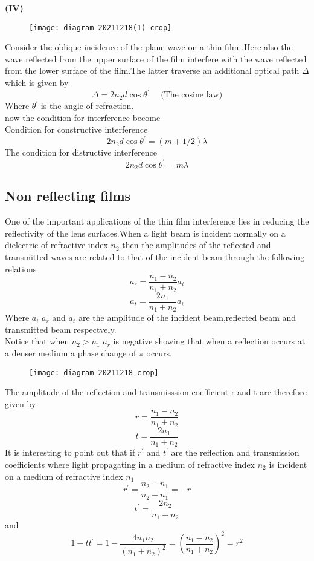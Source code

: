 \textbf{(IV)}
\begin{figure}[H]
	\centering
	\texttt{[image: diagram-20211218(1)-crop]}
	\caption{}
	\label{}
\end{figure}
Consider the oblique incidence of the plane wave on a thin film .Here also the wave reflected from the upper surface of the film interfere with the wave reflected from the lower surface of the film.The latter traverse an additional optical path $\Delta$ which is given by \\
$$\Delta=2n_2d\cos \theta^{\prime} \quad \text{ (The cosine law)}$$
Where $\theta^{\prime}$  is the angle of refraction.\\
now the  condition for interference become\\
Condition for constructive interference 
$$2n_2d\cos \theta^{\prime}=\left( m+1/2\right)\lambda $$
The condition for distructive interference\\
$$2n_2d\cos \theta^{\prime}=m\lambda$$
\subsection{Non reflecting films}
One of the important applications of the thin film interference lies in reducing the reflectivity of the lens surfaces.When a light beam is incident normally on a dielectric of refractive index $n_2$ then the amplitudes of the reflected and transmitted waves are related to that of the incident beam through the following relations\\
$$a_r=\frac{n_1-n_2}{n_1+n_2}a_i$$
$$a_t=\frac{2n_1}{n_1+n_2}a_i$$
Where $a_i$ $a_r$ and $a_t$ are the amplitude of the incident beam,reflected beam and transmitted beam respectvely.\\
Notice that when $n_2>n_1$ $a_r$ is negative showing that when a reflection occurs at a denser medium a phase change of $\pi$ occurs.
\begin{figure}[H]
	\centering
	\texttt{[image: diagram-20211218-crop]}
	\caption{}
	\label{}
\end{figure}
The amplitude of the reflection and transmisssion coefficient r and t are therefore given by\\
$$r=\frac{n_1-n_2}{n_1+n_2}$$
$$t=\frac{2n_1}{n_1+n_2}$$
It is interesting to point out that if $r^{\prime}$ and $t^{\prime}$ are the reflection and transmission coefficients where light propagating in a medium of refractive index $n_2$ is incident on a medium of refractive index $n_1$
$$r^{\prime}=\frac{n_2-n_1}{n_2+n_1}=-r$$
$$t^{\prime}=\frac{2n_2}{n_1+n_2}$$
and 
$$1-tt^{\prime}=1-\frac{4n_1n_2}{(n_1+n_2)^2}=\left( \frac{n_1-n_2}{n_1+n_2}\right) ^2=r^2$$

